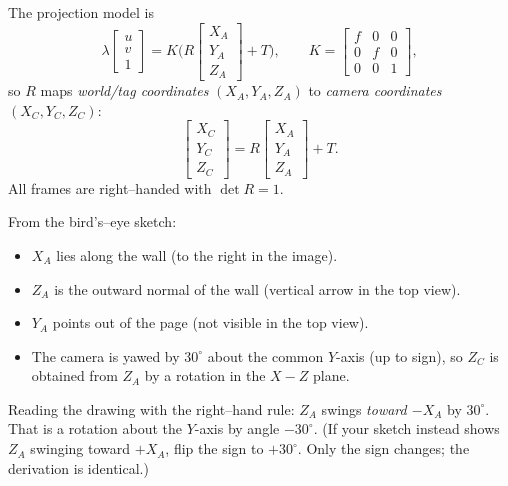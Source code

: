 \documentclass[12pt]{article}
\begin{document}
The projection model  is
\[
\lambda\!\begin{bmatrix}u\\v\\1\end{bmatrix}
=K\Big(R\!\begin{bmatrix}X_A\\Y_A\\Z_A\end{bmatrix}+T\Big),\qquad
K=\begin{bmatrix}f&0&0\\0&f&0\\0&0&1\end{bmatrix},
\]
so \(R\) maps \emph{world/tag coordinates} \((X_A,Y_A,Z_A)\) to \emph{camera
coordinates} \((X_C,Y_C,Z_C)\):
\[
\begin{bmatrix}X_C\\Y_C\\Z_C\end{bmatrix}
=R\begin{bmatrix}X_A\\Y_A\\Z_A\end{bmatrix}+T.
\]
All frames are right–handed with \(\det R=1\).

From the bird’s–eye sketch:
\begin{itemize}
  \item \(X_A\) lies along the wall (to the right in the image).
  \item \(Z_A\) is the outward normal of the wall (vertical arrow in the top view).
  \item \(Y_A\) points out of the page (not visible in the top view).
  \item The camera is yawed by \(30^\circ\) about the common \(Y\)-axis (up to sign), so
  \(Z_C\) is obtained from \(Z_A\) by a rotation in the \(X\!-\!Z\) plane.
\end{itemize}

Reading the drawing with the right–hand rule: \(Z_A\) swings \emph{toward \(-X_A\)} by
\(30^\circ\). That is a rotation about the \(Y\)-axis by angle \(-30^\circ\).
(If your sketch instead shows \(Z_A\) swinging toward \(+X_A\), flip the sign to \(+30^\circ\).
Only the sign changes; the derivation is identical.)
\end{document}
